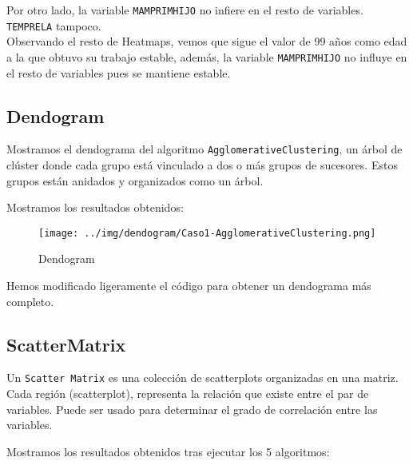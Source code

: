 	Por otro lado, la variable \texttt{MAMPRIMHIJO} no infiere en el resto de variables. \texttt{TEMPRELA} tampoco. \\
	
	Observando el resto de Heatmaps, vemos que sigue el valor de 99 años como edad a la que obtuvo su trabajo estable, además, la variable \texttt{MAMPRIMHIJO} no influye en el resto de variables pues se mantiene estable.
	
	





	\subsection{Dendogram}
	
	Mostramos el dendograma del algoritmo \texttt{AgglomerativeClustering}, un árbol de clúster donde cada grupo está vinculado a dos o más grupos de sucesores. Estos grupos están anidados y organizados como un árbol.
	
	Mostramos los resultados obtenidos:
	\begin{figure}[H]
		\centering
		\texttt{[image: ../img/dendogram/Caso1-AgglomerativeClustering.png]}
		
		\caption{Dendogram}
	\end{figure}


	Hemos modificado ligeramente el código para obtener un dendograma más completo.
	
	
	
	
	
	
	\subsection{ScatterMatrix}
	
	Un \texttt{Scatter Matrix} es una colección de scatterplots organizadas en una matriz. Cada región (scatterplot), representa la relación que existe entre el par de variables. Puede ser usado para determinar el grado de correlación entre las variables.
	
	\newpage
	Mostramos los resultados obtenidos tras ejecutar los 5 algoritmos:
	
	\begin{figure}[H]
		\centering
		
	\end{figure}
	
